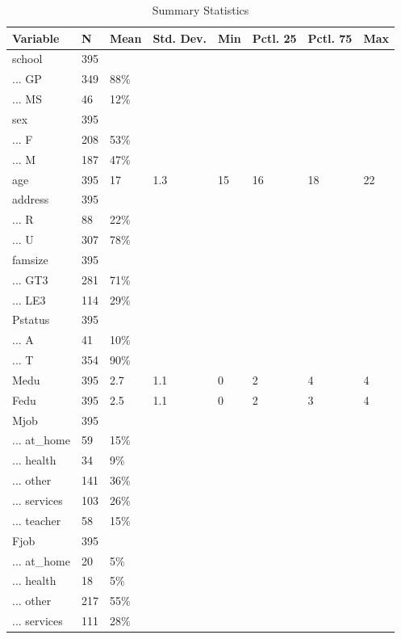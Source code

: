 \documentclass[
  11pt,
]{article}
\begin{document}
\begin{table}

\caption{\label{tab:unnamed-chunk-3}Summary Statistics}
\centering
\begin{tabular}[t]{llllllll}
\toprule
Variable & N & Mean & Std. Dev. & Min & Pctl. 25 & Pctl. 75 & Max\\
\midrule
school & 395 &  &  &  &  &  & \\
... GP & 349 & 88\% &  &  &  &  & \\
... MS & 46 & 12\% &  &  &  &  & \\
sex & 395 &  &  &  &  &  & \\
... F & 208 & 53\% &  &  &  &  & \\
\addlinespace
... M & 187 & 47\% &  &  &  &  & \\
age & 395 & 17 & 1.3 & 15 & 16 & 18 & 22\\
address & 395 &  &  &  &  &  & \\
... R & 88 & 22\% &  &  &  &  & \\
... U & 307 & 78\% &  &  &  &  & \\
\addlinespace
famsize & 395 &  &  &  &  &  & \\
... GT3 & 281 & 71\% &  &  &  &  & \\
... LE3 & 114 & 29\% &  &  &  &  & \\
Pstatus & 395 &  &  &  &  &  & \\
... A & 41 & 10\% &  &  &  &  & \\
\addlinespace
... T & 354 & 90\% &  &  &  &  & \\
Medu & 395 & 2.7 & 1.1 & 0 & 2 & 4 & 4\\
Fedu & 395 & 2.5 & 1.1 & 0 & 2 & 3 & 4\\
Mjob & 395 &  &  &  &  &  & \\
... at\_home & 59 & 15\% &  &  &  &  & \\
\addlinespace
... health & 34 & 9\% &  &  &  &  & \\
... other & 141 & 36\% &  &  &  &  & \\
... services & 103 & 26\% &  &  &  &  & \\
... teacher & 58 & 15\% &  &  &  &  & \\
Fjob & 395 &  &  &  &  &  & \\
\addlinespace
... at\_home & 20 & 5\% &  &  &  &  & \\
... health & 18 & 5\% &  &  &  &  & \\
... other & 217 & 55\% &  &  &  &  & \\
... services & 111 & 28\% &  &  &  &  & \\

\end{tabular}
\end{table}
\end{document}
